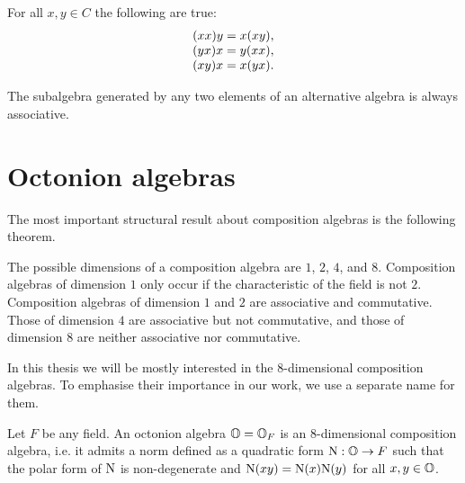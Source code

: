 \begin{lemma}
	For all $x,y \in C$ the following are true:\\
	\begin{equation}
		\begin{array}{r@{\;}c@{\;}l}
			(xx)y & = & x(xy), \\
			(yx)x & = & y(xx), \\
			(xy)x & = & x(yx).
		\end{array}
	\end{equation}
\end{lemma}

\begin{theorem}[Artin]
	The subalgebra generated by any two elements of an alternative algebra is always associative.
\end{theorem}

\section{Octonion algebras}

The most important structural result about composition algebras is the following theorem.

\begin{theorem}
	The possible dimensions of a composition algebra are $1$, $2$, $4$, and $8$. Composition 
	algebras of dimension $1$ only occur if the characteristic	 of the field is not $2$. 
	Composition algebras of dimension $1$ and $2$ are associative and commutative. Those
	of dimension $4$ are associative but not commutative, and those of dimension $8$ are
	neither associative nor commutative. 
\end{theorem}

In this thesis we will be mostly interested in the $8$-dimensional composition algebras. 
To emphasise their importance in our work, we use a separate name for them. 

\begin{definition}
	Let $F$ be any field. An octonion algebra $\mathbb{O} = \mathbb{O}_F$ is an $8$-dimensional composition
	algebra, i.e. it admits a norm defined as a quadratic form $\mathord{\mathrm{N}} : \mathbb{O} \rightarrow F$
	such that the polar form of\/ $\mathord{\mathrm{N}}$ is non-degenerate and $\mathord{\mathrm{N}}(xy) = \mathord{\mathrm{N}}(x) \mathord{\mathrm{N}}(y)$ for 
	all $x,y \in \mathbb{O}$.  
\end{definition}

